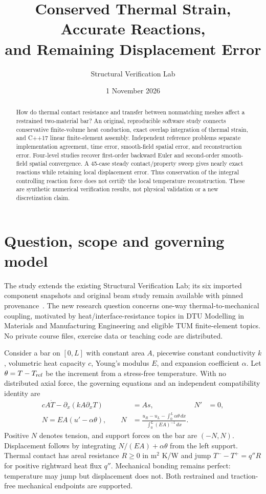 \documentclass[10pt,a4paper]{article}
\title{Conserved Thermal Strain, Accurate Reactions,\\and Remaining Displacement Error}
\author{Structural Verification Lab}
\date{1 November 2026}
\begin{document}
\maketitle
\begin{abstract}
How do thermal contact resistance and transfer between nonmatching meshes affect a restrained two-material bar? An original, reproducible software study connects conservative finite-volume heat conduction, exact overlap integration of thermal strain, and C++17 linear finite-element assembly. Independent reference problems separate implementation agreement, time error, smooth-field spatial error, and reconstruction error. Four-level studies recover first-order backward Euler and second-order smooth-field spatial convergence. A 45-case steady contact/property sweep gives nearly exact reactions while retaining local displacement error. Thus conservation of the integral controlling reaction force does not certify the local temperature reconstruction. These are synthetic numerical verification results, not physical validation or a new discretization claim.
\end{abstract}
\section{Question, scope and governing model}
The study extends the existing Structural Verification Lab; its six imported component snapshots and original beam study remain available with pinned provenance~\cite{code}. The new research question concerns one-way thermal-to-mechanical coupling, motivated by heat/interface-resistance topics in DTU Modelling in Materials and Manufacturing Engineering and eligible TUM finite-element topics. No private course files, exercise data or teaching code are distributed.

Consider a bar on $[0,L]$ with constant area $A$, piecewise constant conductivity $k$, volumetric heat capacity $c$, Young's modulus $E$, and expansion coefficient $\alpha$. Let $\theta=T-T_{\rm ref}$ be the increment from a stress-free temperature. With no distributed axial force, the governing equations and an independent compatibility identity are
\begin{align}
 c A\dot T-\partial_x(kA\partial_x T)&=A s, & N'&=0,\label{eq:heat}\\
 N=EA(u'-\alpha\theta),\qquad
 N&=\frac{u_R-u_L-\int_0^L\alpha\theta\,dx}{\int_0^L(EA)^{-1}\,dx}.\label{eq:force}
\end{align}
Positive $N$ denotes tension, and support forces on the bar are $(-N,N)$. Displacement follows by integrating $N/(EA)+\alpha\theta$ from the left support. Thermal contact has areal resistance $R\geq0$ in m$^2$ K/W and jump $T^- -T^+=q''R$ for positive rightward heat flux $q''$. Mechanical bonding remains perfect: temperature may jump but displacement does not. Both restrained and traction-free mechanical endpoints are supported.
\end{document}
